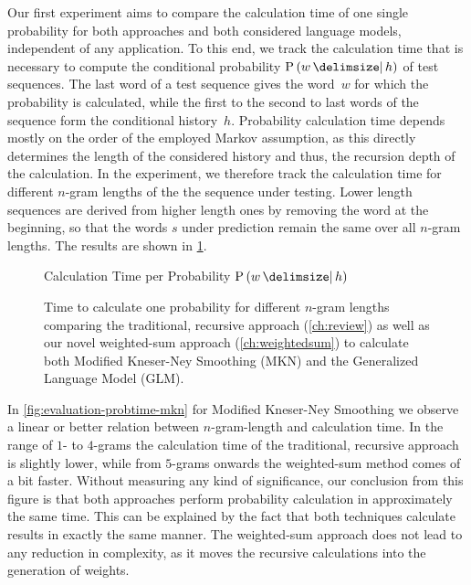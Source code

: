 Our first experiment aims to compare the calculation time of one single
probability for both approaches and both considered language models, independent
of any application.
To this end, we track the calculation time that is necessary to compute
the conditional probability $\Prob{w}{h}$ of test sequences.
The last word of a test sequence gives the word~$w$ for which the probability is
calculated, while the first to the second to last words of the sequence form
the conditional history~$h$.
Probability calculation time depends mostly on the order of the employed Markov
assumption, as this directly determines the length of the considered history
and thus, the recursion depth of the calculation.
In the experiment, we therefore track the calculation time for different
$n$-gram lengths of the the sequence under testing.
Lower length sequences are derived from higher length ones by removing the
word at the beginning, so that the words $s$ under prediction remain the same
over all $n$-gram lengths.
The results are shown in \cref{fig:evaluation-probtime}.

\begin{figure}
  \begin{center}
    Calculation Time per Probability $\Prob{w}{h}$
  \end{center}

  \hspace{-0.21\textwidth}
  \caption{Time to calculate one probability for different $n$-gram lengths
    comparing the traditional, recursive approach (\cref{ch:review}) as well as
    our novel weighted-sum approach (\cref{ch:weightedsum}) to calculate both
    Modified Kneser-Ney Smoothing (MKN) and the Generalized Language Model
    (GLM).}
  \label{fig:evaluation-probtime}
\end{figure}

In \cref{fig:evaluation-probtime-mkn} for Modified Kneser-Ney Smoothing we
observe a linear or better relation between $n$-gram-length and calculation
time.
In the range of $1$- to $4$-grams the calculation time of the traditional,
recursive approach is slightly lower, while from $5$-grams onwards the
weighted-sum method comes of a bit faster.
Without measuring any kind of significance, our conclusion from this figure is
that both approaches perform probability calculation in approximately the same
time.
This can be explained by the fact that both techniques calculate results in
exactly the same manner.
The weighted-sum approach does not lead to any reduction in complexity, as it
moves the recursive calculations into the generation of weights.

